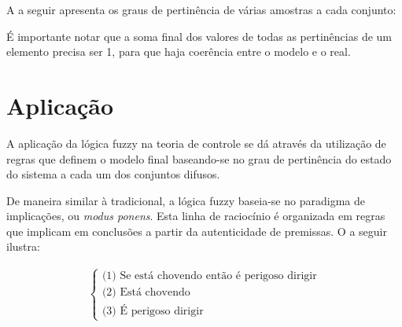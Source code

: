 A  a seguir apresenta os graus de pertinência de várias amostras a cada conjunto:

\begin{table}[!ht]
	\caption{Tabela de Exemplos}
	\label{tabPertEx}
	\small
	\centering
\end{table}

É importante notar que a soma final dos valores de todas as pertinências de um elemento precisa ser 1, para que haja coerência entre o modelo e o real.

\section{Aplicação}
A aplicação da lógica fuzzy na teoria de controle se dá através da utilização de regras que definem o modelo final baseando-se no grau de pertinência do estado do sistema a cada um dos conjuntos difusos. 

De maneira similar à tradicional, a lógica fuzzy baseia-se no paradigma de implicações, ou \textit{modus ponens}. Esta linha de raciocínio é organizada em regras que implicam em conclusões a partir da autenticidade de premissas. O  a seguir ilustra:

\begin{myexmp}  \label{exmpRegrasEx}
	\begin{align*}
		\begin{cases}
			\text{(1) Se está  chovendo então é perigoso dirigir}\\
			\text{(2) Está chovendo }\\
			\text{(3) É perigoso dirigir}
		\end{cases}		
	\end{align*}
\end{myexmp}


